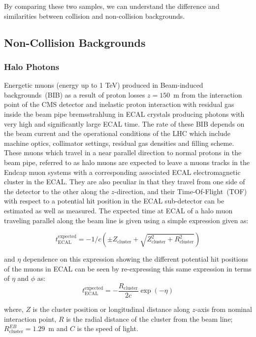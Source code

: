 By comparing these two samples, we can understand the difference and similarities between collision and non-collision backgrounds. 

\subsection{Non-Collision Backgrounds}
\subsubsection{Halo Photons}
Energetic muons (energy up to 1 TeV) produced in Beam-induced backgrounds~(BIB) as a result of proton losses $z = 150$~m from the interaction point of the CMS detector and inelastic proton interaction with residual gas inside the beam pipe bremsstrahlung in ECAL crystals producing photons with very high \pt and significantly large ECAL time. The rate of these BIB depends on the beam current and the operational conditions of the LHC which include machine optics, collimator settings, residual gas densities and filling scheme. These muons which travel in a near parallel direction to normal protons in the beam pipe, referred to as halo muons are expected to leave a muons tracks  in the Endcap muon systems with a corresponding associated ECAL electromagnetic cluster in the ECAL. They are also peculiar in that they travel from one side of the detector to the other along the $z$-direction, and their  Time-Of-Flight~(TOF) with respect to a potential hit position in the ECAL sub-detector can be estimated as well as measured.
The expected time at ECAL of a  halo muon traveling parallel along the beam line is given using a simple expression given as:

\begin{equation}
t^{\mbox{expected}}_{\mbox{ECAL}} = -1/c\left( \pm Z_{\mbox{cluster}} + \sqrt{Z^{2}_{\mbox{cluster}} + R^{2}_{\mbox{cluster}}}  \right)
\end{equation}

and $\eta$ dependence on this expression showing the different potential hit positions of the muons in ECAL can be seen by re-expressing this same expression in terms of $\eta$ and $\phi$ as:
\begin{equation}
t^{\mbox{expected}}_{\mbox{ECAL}} = - \frac{R_{\mbox{cluster}}}{2c} \exp{(-\eta)}
\end{equation} 

where, $Z$ is the cluster position or longitudinal distance along $z$-axis from nominal interaction point, $R$ is the radial distance of the cluster from the beam line; $R^{EB}_{\mbox{cluster}} = 1.29$~m and $C$ is the speed of light.

